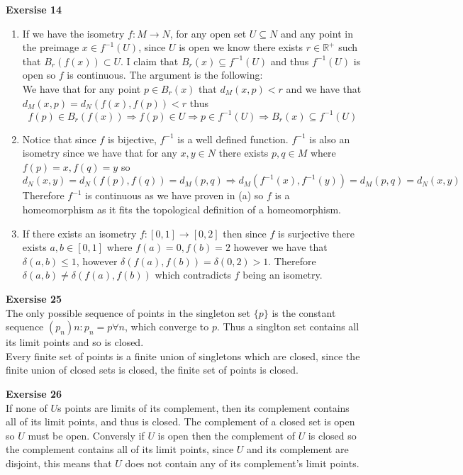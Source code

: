 \documentclass[12pt]{article}
\newenvironment{ques}[1]{\textbf{Exersise #1}\vspace{1 mm}\\ }{\bigskip}
\theoremstyle{definition}
\newcommand{\R}{\mathbb R}
\begin{document}
\begin{ques}{14}
\begin{enumerate}
	\item
		If we have the isometry $f: M \to N$, for any open set $U \subseteq N$
		and any point in the preimage $x \in f^{-1}(U)$, since $U$ is open we
		know there exists $r \in \R^+$ such that $B_r(f(x)) \subset U$. I claim
		that $B_r(x) \subseteq f^{-1}(U)$ and thus $f^{-1}(U)$ is open so $f$ is
		continuous. The argument is the following:\\
		We have that for any point $p \in B_r(x)$ that $d_M(x,p) <r$ and we
		have that $d_M(x, p) = d_N(f(x), f(p)) < r$ thus 
		$$f(p) \in B_r(f(x)) \Rightarrow f(p) \in U \Rightarrow p \in f^{-1}(U)
		\Rightarrow B_r(x) \subseteq f^{-1}(U)$$
	\item
		Notice that since $f$ is bijective, $f^{-1}$ is a well defined
		function. $f^{-1}$ is also an isometry since we have that for any
		$x, y \in N$ there exists $p,q \in M$ where $f(p) = x, f(q) = y$ so
		$$d_N(x,y) = d_N(f(p),f(q)) = d_M(p, q) \Rightarrow
		d_M(f^{-1}(x),f^{-1}(y)) = d_M(p, q) = d_N(x,y)$$
		Therefore $f^{-1}$ is continuous as we have proven in (a) so $f$ is a
		homeomorphism as it fits the topological definition of a homeomorphism.
	\item
		If there exists an isometry $f: [0,1] \to [0,2]$ then since $f$ is
		surjective there exists $a,b \in [0,1]$ where $f(a) = 0, f(b) = 2$
		however we have that $\delta(a,b) \leq 1$, however
		$\delta(f(a),f(b)) = \delta(0, 2) > 1$. Therefore
		$\delta(a,b) \neq \delta(f(a),f(b))$ which contradicts $f$ being an isometry.
		
\end{enumerate}
\end{ques}

\begin{ques}{25}
	The only possible sequence of points in the singleton set $\{p\}$ is the
	constant sequence $(p_n)n: p_n = p \forall n$, which converge to $p$. Thus
	a singlton set contains all its limit points and so is closed.\\
	Every finite set of points is a finite union of singletons which are
	closed, since the finite union of closed sets is closed, the finite set of
	points is closed.
\end{ques}

\begin{ques}{26}
	If none of $U$s points are limits of its complement, then its complement
	contains all of its limit points, and thus is closed. The complement of a
	closed set is open so $U$ must be open. Conversly if $U$ is open then the
	complement of $U$ is closed so the complement contains all of its limit
	points, since $U$ and its complement are disjoint, this means that $U$ does
	not contain any of its complement's limit points.
\end{ques}
\end{document}
